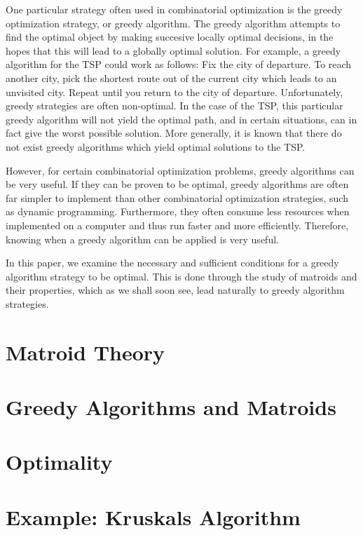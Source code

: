 \documentclass[a4paper,11pt]{report}
\begin{document}
One particular strategy often used in combinatorial optimization is the greedy
optimization strategy, or greedy algorithm. The greedy algorithm attempts to
find the optimal object by making succesive locally optimal decisions, in the
hopes that this will lead to a globally optimal solution. For example, a greedy
algorithm for the TSP could work as follows: Fix the city of departure.
To reach another city, pick the shortest route out of the current city which
leads to an unvisited city. Repeat until you return to the city of departure.
Unfortunately, greedy strategies are often non-optimal. In the case of the TSP,
this particular greedy algorithm will not yield the optimal path, and in
certain situations, can in fact give the worst possible solution. More
generally, it is known that there do not exist greedy algorithms which yield
optimal solutions to the TSP.


However, for certain combinatorial optimization problems, greedy algorithms
can be very useful. If they can be proven to be optimal, greedy algorithms
are often far simpler to implement than other combinatorial optimization
strategies, such as dynamic programming. Furthermore, they often consume
less resources when implemented on a computer and thus run faster and more
efficiently. Therefore, knowing when a greedy algorithm can be applied is
very useful.

In this paper, we examine the necessary and sufficient conditions for a
greedy algorithm strategy to be optimal. This is done through the study
of matroids and their properties, which as we shall soon see, lead naturally
to greedy algorithm strategies.


\section{Matroid Theory}

\section{Greedy Algorithms and Matroids}

\section{Optimality}

\section{Example: Kruskals Algorithm}

\nocite{*}

\clearpage


\end{document}
